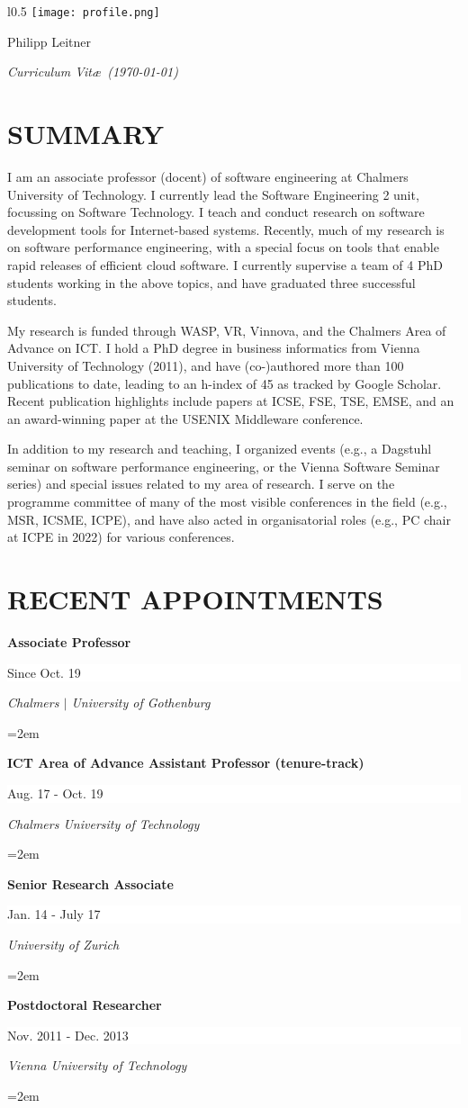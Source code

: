 \documentclass[paper=letter,fontsize=11pt]{scrartcl} %
\newcommand{\MyName}[1]{ %
		\Huge \usefont{OT1}{phv}{b}{n} \hfill #1
		\par \normalsize \normalfont}
\newcommand{\MySlogan}[1]{ %
		\large \usefont{OT1}{phv}{m}{n}\hfill \textit{#1}
		\par \normalsize \normalfont}
\newcommand{\NewPart}[2]{\section*{\uppercase{#1} #2}}
\newcommand{\EducationEntry}[4]{
		\noindent \textbf{#1} \hfill      %
		\colorbox{White}{%
			\parbox{10em}{%
			\hfill\color{Black}#2}} \par  %
		\noindent \textit{#3} \par        %
		\noindent\hangindent=2em\hangafter=0 \small #4 %
		\normalsize \par}
\begin{document}

\begin{wrapfigure}{l}{0.5\textwidth}
	\vspace*{-2em}
		\texttt{[image: profile.png]}
\end{wrapfigure}

\MyName{Philipp Leitner}
\MySlogan{Curriculum Vit\ae\ (\today)}

\vspace{1cm}

\NewPart{Summary}{}
I am an associate professor (docent) of software engineering at Chalmers University of Technology. I currently lead the Software Engineering 2 unit, focussing on Software Technology. I teach and conduct research on software development tools for Internet-based systems. Recently, much of my research is on software performance engineering, with a special focus on tools that enable rapid releases of efficient cloud software. I currently supervise a team of 4 PhD students working in the above topics, and have graduated three successful students.

My research is funded through WASP, VR, Vinnova, and the Chalmers Area of Advance on ICT. I hold a PhD degree in business informatics from Vienna University of Technology (2011), and have (co-)authored more than 100 publications to date, leading to an h-index of 45 as tracked by Google Scholar. Recent publication highlights include papers at ICSE, FSE, TSE, EMSE, and an an award-winning paper at the USENIX Middleware conference.

In addition to my research and teaching, I organized events (e.g., a Dagstuhl seminar on software performance engineering, or the Vienna Software Seminar series) and special issues related to my area of research. I serve on the programme committee of many of the most visible conferences in the field (e.g., MSR, ICSME, ICPE), and have also acted in organisatorial roles (e.g., PC chair at ICPE in 2022) for various conferences.


\NewPart{Recent Appointments}{}
\EducationEntry{Associate Professor}{Since Oct. 19}{Chalmers $|$ University of Gothenburg}{}
\EducationEntry{ICT Area of Advance Assistant Professor (tenure-track)}{Aug. 17 - Oct. 19}{Chalmers University of Technology}{}

\EducationEntry{Senior Research Associate}{Jan. 14 - July 17}{University of
Zurich}{
}
\EducationEntry{Postdoctoral Researcher}{Nov. 2011 - Dec. 2013}{Vienna
University of Technology}{}
\end{document}
